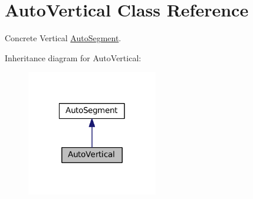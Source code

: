 \hypertarget{classKatabatic_1_1AutoVertical}{}\section{Auto\+Vertical Class Reference}
\label{classKatabatic_1_1AutoVertical}


Concrete Vertical \mbox{\hyperlink{classKatabatic_1_1AutoSegment}{Auto\+Segment}}.  




Inheritance diagram for Auto\+Vertical\+:\nopagebreak
\begin{figure}[H]
\begin{center}
\leavevmode
\includegraphics[width=162pt]{classKatabatic_1_1AutoVertical__inherit__graph}
\end{center}
\end{figure}
